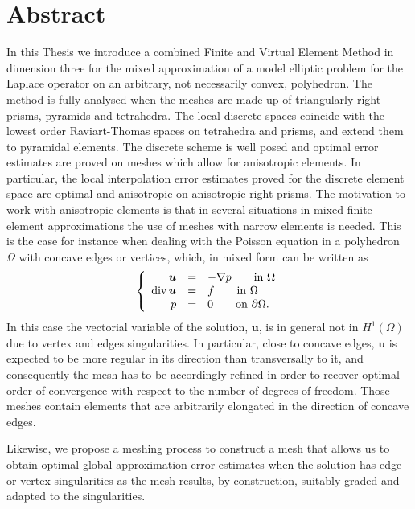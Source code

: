 \documentclass[12pt,a4paper,openany,oneside]{book}
\begin{document}
\section*{Abstract}
In this Thesis we introduce a combined Finite and Virtual Element Method in dimension three
for the mixed approximation of a 
model elliptic problem for the Laplace operator on an 
arbitrary, not necessarily convex, polyhedron. 
The 
method is fully analysed when the meshes are made up of triangularly
right prisms, pyramids and tetrahedra. The local discrete 
spaces coincide with the lowest order Raviart-Thomas 
spaces on tetrahedra and prisms, and 
extend them to pyramidal elements. The discrete scheme 
is well posed and optimal error estimates are proved on meshes which 
allow for anisotropic elements. In particular, the local 
interpolation error estimates proved for the discrete element space are 
optimal and anisotropic on anisotropic right prisms.
The motivation to work with anisotropic elements is that 
in several situations in mixed finite element approximations the use of meshes 
with narrow elements is needed. 
This is the case for instance when dealing with the Poisson equation 
in a polyhedron $\Omega$ with concave edges or vertices, which, in mixed form
can be written as
\begin{equation*}\label{mf} \left\{\begin{array}{rcl}
\boldsymbol{u}&=&-\nabla p\qquad \mbox{in }\Omega\\
\mbox{div\,}\boldsymbol{u}&=&f\qquad \mbox{in }\Omega\\
p&=&0\qquad\mbox{on }\partial\Omega.\end{array}\right.
\end{equation*}
In this case the vectorial variable of the solution, $\boldsymbol{u}$, is in 
general not in $H^1(\Omega)$ due to vertex and edges 
singularities. In particular, close to concave edges, 
$\boldsymbol{u}$ is expected to be more regular in its direction than transversally 
to it, and consequently the mesh has to be accordingly refined in order to 
recover optimal order of convergence with respect to the number of degrees of 
freedom. Those meshes contain elements that are arbitrarily elongated
in the direction of concave edges.

Likewise, we propose a meshing process to construct a mesh that
allows us to  obtain optimal global 
approximation error estimates when the 
solution has edge or vertex singularities as the mesh results, by construction,
suitably graded and adapted to the singularities.
\end{document}
